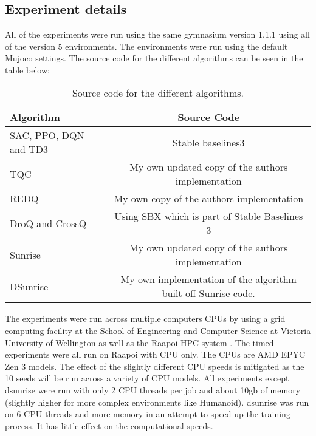 \chapter{}\label{C:appendixA}

\section{Experiment details}

All of the experiments were run using the same gymnasium version 1.1.1 using all of the version 5 environments. The environments were run using the default Mujoco settings. The source code for the different algorithms can be seen in the table below:

\begin{table}[H]
\centering
\caption{Source code for the different algorithms.}
\label{tab:sourcecode}
\begin{tabular}{l|c}
\toprule
\textbf{Algorithm}                & \textbf{Source Code}             \\
\midrule\midrule
SAC, PPO, DQN and TD3 & Stable baselines3 \cite{stable-baselines3} \\

TQC & My own updated copy of the authors implementation \cite{thompson1jamesthompson1Tqc_pytorch2025} \cite{SamsungLabsTqc_pytorchImplementation} \\
REDQ & My own copy of the authors implementation \cite{thompson1jamesthompson1REDQ2025} \cite{watchernyuWatchernyuREDQ2025} \\
DroQ and CrossQ & Using SBX which is part of Stable Baselines 3 \cite{stable-baselines3} \\
Sunrise & My own updated copy of the authors implementation \cite{thompson1jamesthompson1Sunrise2025} \cite{leePokaxpokaSunrise2025} \\
DSunrise & My own implementation of the algorithm built off Sunrise code. \cite{thompson1jamesthompson1Sunrise2025} \\
\bottomrule
\end{tabular}
\end{table}

The experiments were run across multiple computers CPUs by using a grid computing facility at the School of Engineering and Computer Science at Victoria University of Wellington as well as the Raapoi HPC system \cite{RapoiClusterDocumentation}. The timed experiments were all run on Raapoi with CPU only. The CPUs are AMD EPYC Zen 3 models. The effect of the slightly different CPU speeds is mitigated as the 10 seeds will be run across a variety of CPU models. All experiments except dsunrise were run with only 2 CPU threads per job and about 10gb of memory (slightly higher for more complex environments like Humanoid). dsunrise was run on 6 CPU threads and more memory in an attempt to speed up the training process. It has little effect on the computational speeds.

